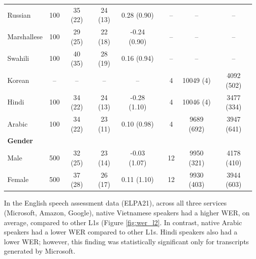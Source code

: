 \documentclass [PhD] {uclathes}
\begin{document}
\begin{table}
\begin{tabular}{lcccccccc}
\hspace{3mm} Russian & 100 & 35 (22) & 24 (13) & 0.28 (0.90) & & -- & -- & -- \\
\hspace{3mm} Marshallese & 100 & 29 (25) & 22 (18) & -0.24 (0.90) & & -- & -- & -- \\
\hspace{3mm} Swahili & 100 & 40 (35) & 28 (19) & 0.16 (0.94) & & -- & -- & -- \\
\hspace{3mm} Korean & -- & -- & -- & -- & & 4 & 10049 (4) & 4092 (502) \\
\hspace{3mm} Hindi & 100 & 34 (22) & 24 (13) & -0.28 (1.10) & & 4 & 10046 (4) & 3477 (334) \\
\hspace{3mm} Arabic & 100 & 34 (22) & 23 (11) & 0.10 (0.98) & & 4 & 9689 (692) & 3947 (641) \\
\textbf{Gender} &  &  &  &  & &  &  &  \\
\hspace{3mm} Male & 500 & 32 (25) & 23 (14) & -0.03 (1.07) & & 12 & 9950 (321) & 4178 (410) \\
\hspace{3mm} Female & 500 & 37 (28) & 26 (17) & 0.11 (1.10) & & 12 & 9930 (403) & 3944 (603) \\
\bottomrule
  \end{tabular}
\end{table}

In the English speech assessment data (ELPA21), across all three services (Microsoft, Amazon, Google), native Vietnamese speakers had a higher WER, on average, compared to other L1s (Figure \ref{fig:wer_l2}. In contrast, native Arabic speakers had a lower WER compared to other L1s. Hindi speakers also had a lower WER; however, this finding was statistically significant only for transcripts generated by Microsoft. 
\end{document}
